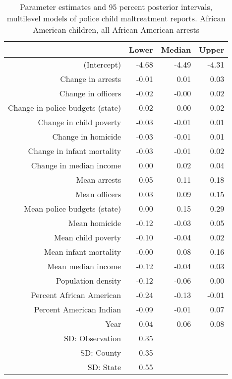 \begin{table}[ht]
\centering
\begin{tabular}{rrrr}
  \hline
 & Lower & Median & Upper \\ 
  \hline
(Intercept) & -4.68 & -4.49 & -4.31 \\ 
  Change in arrests & -0.01 & 0.01 & 0.03 \\ 
  Change in officers & -0.02 & -0.00 & 0.02 \\ 
  Change in police budgets (state) & -0.02 & 0.00 & 0.02 \\ 
  Change in child poverty & -0.03 & -0.01 & 0.01 \\ 
  Change in homicide & -0.03 & -0.01 & 0.01 \\ 
  Change in infant mortality & -0.03 & -0.01 & 0.02 \\ 
  Change in median income & 0.00 & 0.02 & 0.04 \\ 
  Mean arrests & 0.05 & 0.11 & 0.18 \\ 
  Mean officers & 0.03 & 0.09 & 0.15 \\ 
  Mean police budgets (state) & 0.00 & 0.15 & 0.29 \\ 
  Mean homicide & -0.12 & -0.03 & 0.05 \\ 
  Mean child poverty & -0.10 & -0.04 & 0.02 \\ 
  Mean infant mortality & -0.00 & 0.08 & 0.16 \\ 
  Mean median income & -0.12 & -0.04 & 0.03 \\ 
  Population density & -0.12 & -0.06 & 0.00 \\ 
  Percent African American & -0.24 & -0.13 & -0.01 \\ 
  Percent American Indian & -0.09 & -0.01 & 0.07 \\ 
  Year & 0.04 & 0.06 & 0.08 \\ 
  SD: Observation & 0.35 &  &  \\ 
  SD: County & 0.35 &  &  \\ 
  SD: State & 0.55 &  &  \\ 
   \hline
\end{tabular}
\caption{Parameter estimates and 95 percent posterior intervals, multilevel models of 
             police child maltreatment reports. African American children, all African American arrests} 
\end{table}
